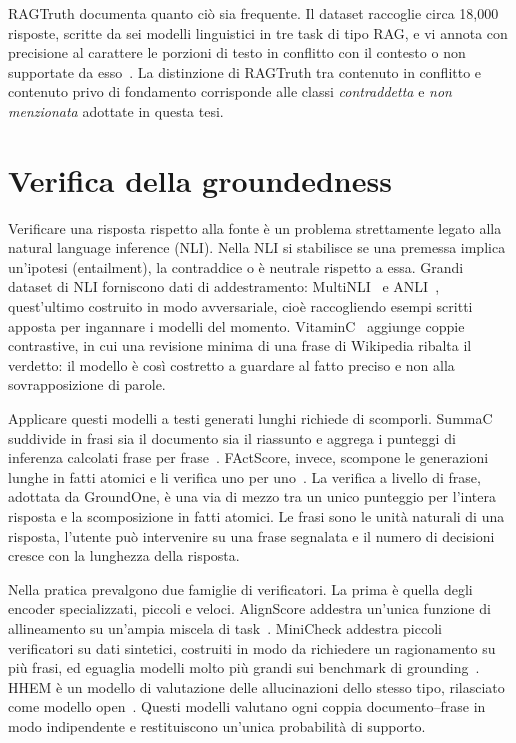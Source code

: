 RAGTruth documenta quanto ciò sia frequente. Il dataset raccoglie circa 18{,}000 risposte, scritte da sei modelli
linguistici in tre task di tipo RAG, e vi annota con precisione al carattere le porzioni di testo in conflitto con il
contesto o non supportate da esso~\cite{niu2024ragtruth}. La distinzione di RAGTruth tra contenuto in conflitto e
contenuto privo di fondamento corrisponde alle classi \emph{contraddetta} e \emph{non menzionata} adottate in questa
tesi.

\section{Verifica della groundedness}
\label{sec:bg-verification}

Verificare una risposta rispetto alla fonte è un problema strettamente legato alla natural language inference (NLI). Nella
NLI si stabilisce se una premessa implica un'ipotesi (entailment), la contraddice o è neutrale rispetto a essa. Grandi
dataset di NLI forniscono dati di addestramento: MultiNLI~\cite{williams2018mnli} e ANLI~\cite{nie2020anli}, quest'ultimo
costruito in modo avversariale, cioè raccogliendo esempi scritti apposta per ingannare i modelli del momento.
VitaminC~\cite{schuster2021vitaminc} aggiunge coppie contrastive, in cui una revisione minima di una frase di Wikipedia
ribalta il verdetto: il modello è così costretto a guardare al fatto preciso e non alla sovrapposizione di parole.

Applicare questi modelli a testi generati lunghi richiede di scomporli. SummaC suddivide in frasi sia il documento sia il
riassunto e aggrega i punteggi di inferenza calcolati frase per frase~\cite{laban2022summac}. FActScore, invece, scompone
le generazioni lunghe in fatti atomici e li verifica uno per uno~\cite{min2023factscore}. La verifica a livello di frase,
adottata da GroundOne, è una via di mezzo tra un unico punteggio per l'intera risposta e la scomposizione in fatti atomici. Le frasi sono le unità naturali di una risposta, l'utente può intervenire su
una frase segnalata e il numero di decisioni cresce con la lunghezza della risposta.

Nella pratica prevalgono due famiglie di verificatori. La prima è quella degli encoder specializzati, piccoli e veloci.
AlignScore addestra un'unica funzione di allineamento su un'ampia miscela di task~\cite{zha2023alignscore}. MiniCheck
addestra piccoli verificatori su dati sintetici, costruiti in modo da richiedere un ragionamento su più frasi, ed eguaglia
modelli molto più grandi sui benchmark di grounding~\cite{tang2024minicheck}. HHEM è un modello di valutazione delle
allucinazioni dello stesso tipo, rilasciato come modello open~\cite{vectara2024hhem}. Questi modelli valutano ogni coppia
documento--frase in modo indipendente e restituiscono un'unica probabilità di supporto.


